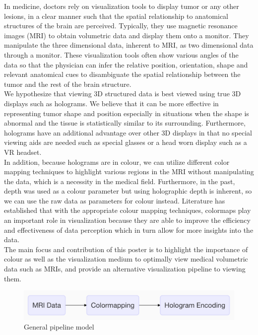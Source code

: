 In medicine, doctors rely on visualization tools to display tumor or any other lesions, in a clear manner such that the spatial relationship to anatomical structures of the brain are perceived.  Typically, they use magnetic resonance images (MRI) to obtain volumetric data and display them onto a monitor.  They manipulate the three dimensional data, inherent to MRI, as two dimensional data through a monitor.  These visualization tools often show various angles of the data so that the physician can infer the relative position, orientation, shape and relevant anatomical cues to disambiguate the spatial relationship between the tumor and the rest of the brain structure.\\

We hypothesize that viewing 3D structured data is best viewed using true 3D displays such as holograms. We believe that it can be more effective in representing tumor shape and position especially in situations when the shape is abnormal and the tissue is statistically similar to its surrounding.  Furthermore, holograms have an additional advantage over other 3D displays in that no special viewing aids are needed such as special glasses or a head worn display such as a VR headset.  \\

In addition, because holograms are in colour, we can utilize different color mapping techniques to highlight various regions in the MRI without manipulating the data, which is a necessity in the medical field.  Furthermore, in the past, depth was used as a colour parameter but using holographic depth is inherent, so we can use the raw data as parameters for colour instead. Literature has established that with the appropriate colour mapping techniques, colormaps play an important role in visualization because they are able to improve the efficiency and effectiveness of data perception which in turn allow for more insights into the data.\\

The main focus and contribution of this poster is to highlight the importance of colour as well as the visualization medium to optimally view medical volumetric data such as MRIs, and provide an alternative visualization pipeline to viewing them.

\begin{figure}[h]
 \centering %
 \includegraphics[width=\columnwidth]{pictures/general-model.png}
 \caption{General pipeline model}
 \label{fig:general-model}
\end{figure}
